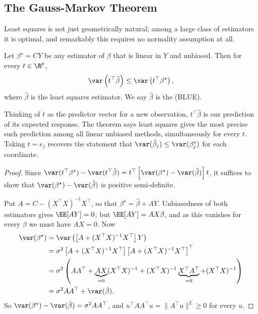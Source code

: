 \subsection{The Gauss-Markov Theorem}

Least squares is not just geometrically natural; among a large class of estimators it is optimal, and remarkably this requires no normality assumption at all.

\begin{theorem}
  Let $\beta^\star = CY$ be any estimator of $\beta$ that is linear in $Y$ and unbiased. Then for every $t\in\R^p$,
  $$
  \var\left(t^\top\hat\beta\right) \leq \var\left(t^\top\beta^\star\right),
  $$
  where $\hat\beta$ is the least squares estimator. We say $\hat\beta$ is the  (BLUE).
\end{theorem}

\begin{remark}
  Thinking of $t$ as the predictor vector for a new observation, $t^\top\hat\beta$ is our prediction of its expected response. The theorem says least squares gives the most precise such prediction among all linear unbiased methods, simultaneously for every $t$. Taking $t = e_j$ recovers the statement that $\var(\hat\beta_j)\leq\var(\beta_j^\star)$ for each coordinate.
\end{remark}

\begin{proof}
  Since $\var(t^\top\beta^\star) - \var(t^\top\hat\beta) = t^\top\left[\var(\beta^\star)-\var(\hat\beta)\right]t$, it suffices to show that $\var(\beta^\star)-\var(\hat\beta)$ is positive semi-definite.

  Put $A = C - (X^\top X)^{-1}X^\top$, so that $\beta^\star = \hat\beta + AY$. Unbiasedness of both estimators gives $\EE[AY] = 0$; but $\EE[AY] = AX\beta$, and as this vanishes for every $\beta$ we must have $AX = 0$. Now
  \begin{align*}
    \var(\beta^\star) &= \var\left(\left[A + (X^\top X)^{-1}X^\top\right]Y\right)\\
    &= \sigma^2\left[A + (X^\top X)^{-1}X^\top\right]\left[A+(X^\top X)^{-1}X^\top\right]^\top\\
    &= \sigma^2\left(AA^\top + \underbrace{AX}_{=0}(X^\top X)^{-1} + (X^\top X)^{-1}\underbrace{X^\top A^\top}_{=0} + (X^\top X)^{-1}\right)\\
    &= \sigma^2 AA^\top + \var(\hat\beta).
  \end{align*}
  So $\var(\beta^\star)-\var(\hat\beta) = \sigma^2 AA^\top$, and $u^\top AA^\top u = \|A^\top u\|^2\geq 0$ for every $u$.
\end{proof}

